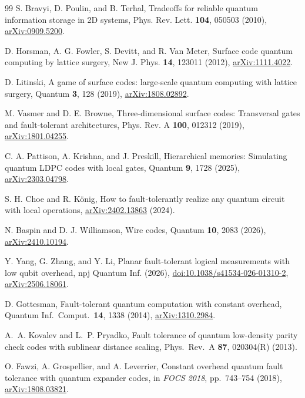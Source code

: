 \begin{thebibliography}{99}
S. Bravyi, D. Poulin, and B. Terhal, Tradeoffs for reliable quantum information storage in 2D systems, Phys. Rev. Lett. \textbf{104}, 050503 (2010), \href{https://arxiv.org/abs/0909.5200}{arXiv:0909.5200}.

D. Horsman, A. G. Fowler, S. Devitt, and R. Van Meter, Surface code quantum computing by lattice surgery, New J. Phys. \textbf{14}, 123011 (2012), \href{https://arxiv.org/abs/1111.4022}{arXiv:1111.4022}.

D. Litinski, A game of surface codes: large-scale quantum computing with lattice surgery, Quantum \textbf{3}, 128 (2019), \href{https://arxiv.org/abs/1808.02892}{arXiv:1808.02892}.

M. Vasmer and D. E. Browne, Three-dimensional surface codes: Transversal gates and fault-tolerant architectures, Phys. Rev. A \textbf{100}, 012312 (2019), \href{https://arxiv.org/abs/1801.04255}{arXiv:1801.04255}.

C. A. Pattison, A. Krishna, and J. Preskill, Hierarchical memories: Simulating quantum LDPC codes with local gates, Quantum \textbf{9}, 1728 (2025), \href{https://arxiv.org/abs/2303.04798}{arXiv:2303.04798}.

S. H. Choe and R. K\"onig, How to fault-tolerantly realize any quantum circuit with local operations, \href{https://arxiv.org/abs/2402.13863}{arXiv:2402.13863} (2024).

N. Baspin and D. J. Williamson, Wire codes, Quantum \textbf{10}, 2083 (2026), \href{https://arxiv.org/abs/2410.10194}{arXiv:2410.10194}.

Y. Yang, G. Zhang, and Y. Li, Planar fault-tolerant logical measurements with low qubit overhead, npj Quantum Inf. (2026), \href{https://doi.org/10.1038/s41534-026-01310-2}{doi:10.1038/s41534-026-01310-2}, \href{https://arxiv.org/abs/2506.18061}{arXiv:2506.18061}.

D. Gottesman, Fault-tolerant quantum computation with constant overhead, Quantum Inf.\ Comput.\ \textbf{14}, 1338 (2014), \href{https://arxiv.org/abs/1310.2984}{arXiv:1310.2984}.

A.~A. Kovalev and L.~P. Pryadko, Fault tolerance of quantum low-density parity check codes with sublinear distance scaling, Phys.\ Rev.\ A \textbf{87}, 020304(R) (2013).

O. Fawzi, A. Grospellier, and A. Leverrier, Constant overhead quantum fault tolerance with quantum expander codes, in \emph{FOCS 2018}, pp.\ 743--754 (2018), \href{https://arxiv.org/abs/1808.03821}{arXiv:1808.03821}.


\end{thebibliography}
